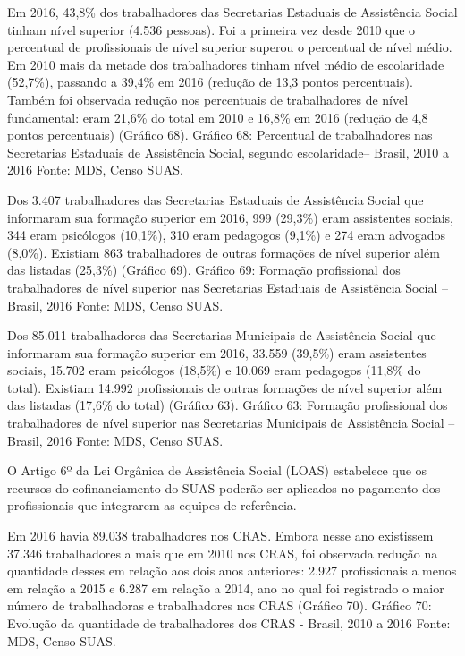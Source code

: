 \documentclass[
  brazilian]{report}
\begin{document}
Em 2016, 43,8\% dos trabalhadores das Secretarias Estaduais de
Assistência Social tinham nível superior (4.536 pessoas). Foi a primeira
vez desde 2010 que o percentual de profissionais de nível superior
superou o percentual de nível médio. Em 2010 mais da metade dos
trabalhadores tinham nível médio de escolaridade (52,7\%), passando a
39,4\% em 2016 (redução de 13,3 pontos percentuais). Também foi
observada redução nos percentuais de trabalhadores de nível fundamental:
eram 21,6\% do total em 2010 e 16,8\% em 2016 (redução de 4,8 pontos
percentuais) (Gráfico 68). Gráfico 68: Percentual de trabalhadores nas
Secretarias Estaduais de Assistência Social, segundo escolaridade--
Brasil, 2010 a 2016 Fonte: MDS, Censo SUAS.

Dos 3.407 trabalhadores das Secretarias Estaduais de Assistência Social
que informaram sua formação superior em 2016, 999 (29,3\%) eram
assistentes sociais, 344 eram psicólogos (10,1\%), 310 eram pedagogos
(9,1\%) e 274 eram advogados (8,0\%). Existiam 863 trabalhadores de
outras formações de nível superior além das listadas (25,3\%) (Gráfico
69). Gráfico 69: Formação profissional dos trabalhadores de nível
superior nas Secretarias Estaduais de Assistência Social -- Brasil, 2016
Fonte: MDS, Censo SUAS.

Dos 85.011 trabalhadores das Secretarias Municipais de Assistência
Social que informaram sua formação superior em 2016, 33.559 (39,5\%)
eram assistentes sociais, 15.702 eram psicólogos (18,5\%) e 10.069 eram
pedagogos (11,8\% do total). Existiam 14.992 profissionais de outras
formações de nível superior além das listadas (17,6\% do total) (Gráfico
63). Gráfico 63: Formação profissional dos trabalhadores de nível
superior nas Secretarias Municipais de Assistência Social -- Brasil,
2016 Fonte: MDS, Censo SUAS.

O Artigo 6º da Lei Orgânica de Assistência Social (LOAS) estabelece que
os recursos do cofinanciamento do SUAS poderão ser aplicados no
pagamento dos profissionais que integrarem as equipes de referência.

Em 2016 havia 89.038 trabalhadores nos CRAS. Embora nesse ano existissem
37.346 trabalhadores a mais que em 2010 nos CRAS, foi observada redução
na quantidade desses em relação aos dois anos anteriores: 2.927
profissionais a menos em relação a 2015 e 6.287 em relação a 2014, ano
no qual foi registrado o maior número de trabalhadoras e trabalhadores
nos CRAS (Gráfico 70). Gráfico 70: Evolução da quantidade de
trabalhadores dos CRAS - Brasil, 2010 a 2016 Fonte: MDS, Censo SUAS.
\end{document}
